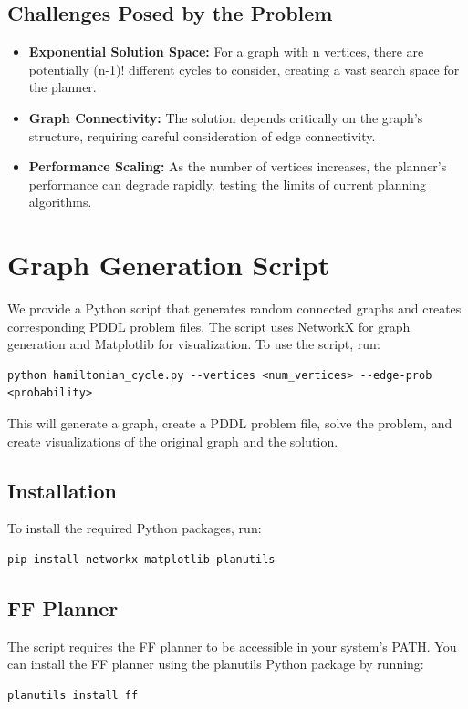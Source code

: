 \documentclass[a4paper,11pt]{article}
\begin{document}
\subsection{Challenges Posed by the Problem}
\begin{itemize}
    \item \textbf{Exponential Solution Space:} For a graph with n vertices, there are potentially (n-1)! different cycles to consider, creating a vast search space for the planner.
    \item \textbf{Graph Connectivity:} The solution depends critically on the graph's structure, requiring careful consideration of edge connectivity.
    \item \textbf{Performance Scaling:} As the number of vertices increases, the planner's performance can degrade rapidly, testing the limits of current planning algorithms.
\end{itemize}

\section{Graph Generation Script}
We provide a Python script that generates random connected graphs and creates corresponding PDDL problem files. The script uses NetworkX for graph generation and Matplotlib for visualization. To use the script, run:
\begin{verbatim}
python hamiltonian_cycle.py --vertices <num_vertices> --edge-prob <probability>
\end{verbatim}
This will generate a graph, create a PDDL problem file, solve the problem, and create visualizations of the original graph and the solution.

\subsection*{Installation}
To install the required Python packages, run:
\begin{verbatim}
pip install networkx matplotlib planutils
\end{verbatim}

\subsection*{FF Planner}
The script requires the FF planner to be accessible in your system's PATH. You can install the FF planner using the planutils Python package by running:
\begin{verbatim}
planutils install ff
\end{verbatim}
\end{document}

